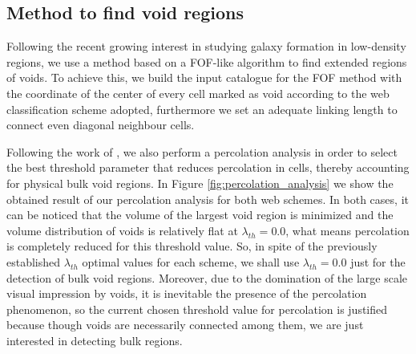 \documentclass[a4,useAMS,usenatbib,usegraphicx]{latex/mn2e}
\begin{document}
\subsection{Method to find void regions}
\label{subsec:method_voids}



Following the recent growing interest in studying galaxy formation in 
low-density regions, we use a method based on a FOF-like algorithm to 
find extended regions of voids. To achieve this, we build the input 
catalogue for the FOF method with the coordinate of the center of every 
cell marked as void according to the web classification scheme adopted, 
furthermore we set an adequate linking length to connect even diagonal 
neighbour cells.



Following the work of , we also perform a 
percolation analysis in order to select the best threshold parameter that
reduces percolation in cells, thereby accounting for physical bulk void 
regions. In Figure \ref{fig:percolation_analysis} we show the obtained 
result of our percolation analysis for both web schemes. In both cases, it 
can be noticed that the volume of the largest void region is minimized and 
the volume distribution of voids is relatively flat at $\lambda_{th} = 0.0$, 
what means percolation is completely reduced for this threshold value. So, 
in spite of the previously established $\lambda_{th}$ optimal values for 
each scheme, we shall use $\lambda_{th} = 0.0$ just for the detection of 
bulk void regions. Moreover, due to the domination of the large scale 
visual impression by voids, it is inevitable the presence of the 
percolation phenomenon, so the current chosen threshold value for 
percolation is justified because though voids are necessarily connected 
among them, we are just interested in detecting bulk regions.
\end{document}
